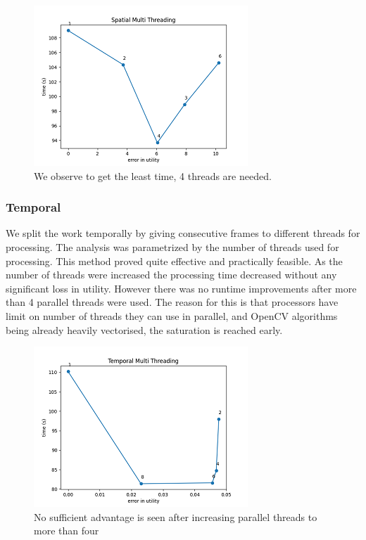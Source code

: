 \documentclass[conference]{IEEEtran}
\begin{document}
\begin{figure}[htbp]
\centerline{\includegraphics{plots/plot_split_frame.png}}
\caption{We observe to get the least time, 4 threads are needed.}
\label{smt_evt} 
\end{figure}


\subsubsection{Temporal}
We split the work temporally by giving consecutive frames to different threads for processing. The analysis was parametrized by the number of threads used for processing. This method proved quite effective and practically feasible. As the number of threads were increased the processing time decreased without any significant loss in utility.
However there was no runtime improvements after more than 4 parallel threads were used. The reason for this is that processors have limit on number of threads they can use in parallel, and OpenCV algorithms being already heavily vectorised, the saturation is reached early.

\begin{figure}[htbp]
\centerline{\includegraphics{plots/plot_split_video.png}}
\caption{No sufficient advantage is seen after increasing parallel threads to more than four}
\label{tmt_pvt} 
\end{figure}
\end{document}
